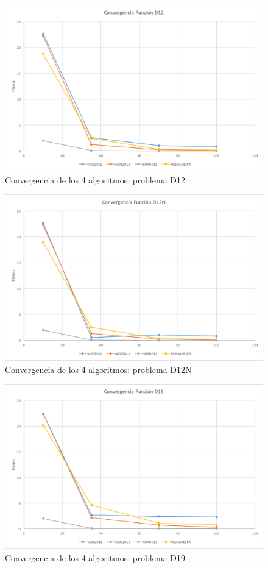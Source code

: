 \begin{figure}[H]
	\centering
	\includegraphics[scale=0.6]{imagenes/ConvergenciaD12}
	\caption{Convergencia de los 4 algoritmos: problema D12}
	\label{fig:ConvgD12}
\end{figure}

\begin{figure}[H]
	\centering
	\includegraphics[scale=0.6]{imagenes/ConvergenciaD12N}
	\caption{Convergencia de los 4 algoritmos: problema D12N}
	\label{fig:ConvgD12N}
\end{figure}

\begin{figure}[H]
	\centering
	\includegraphics[scale=0.6]{imagenes/ConvergenciaD19}
	\caption{Convergencia de los 4 algoritmos: problema D19}
	\label{fig:ConvgD19}
\end{figure}

